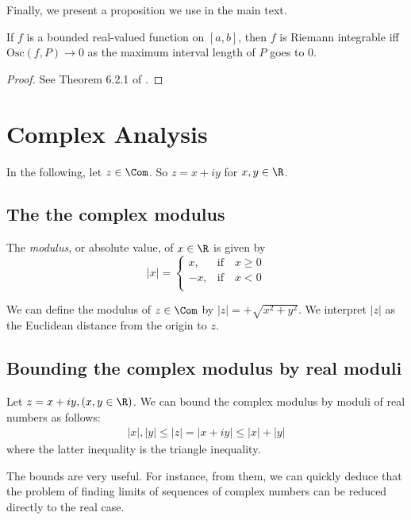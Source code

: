 \documentclass{article} %
\begin{document}
Finally, we present a proposition we use in the main text. 

\begin{proposition}
If $f$ is a bounded real-valued function on $[a,b]$, then $f$ is Riemann integrable iff $\text{Osc}(f,P) \to 0$ as the maximum interval length of $P$ goes to 0.
\label{prop:Riemann_integrable_iff_oscillation_goes_to_zero_as_partition_gets_finer}
\end{proposition}

\begin{proof}
See Theorem 6.2.1 of \cite{strichartz2000way}.	
\end{proof}

\section{Complex Analysis}

In the following, let $z \in \Com$. So $z = x+iy$ for $x,y \in \R$.  

\subsection{The the complex modulus} 

The \textit{modulus}, or absolute value, of $x \in \R$ is given by 
\[ |x| = 
\begin{cases}
x, & \text{if} \quad  x\geq 0 \\
-x, & \text{if} \quad x<0 \\ 	
\end{cases}
 \]

We can define the modulus of $z \in \Com$ by $|z| = + \sqrt{x^2 + y^2}$.   We interpret $|z|$ as the Euclidean distance from the origin to $z$. 

\subsection{Bounding the complex modulus by real moduli} 

 Let $z=x+iy, 	(x, y \in \R)$.   We can bound the complex modulus by moduli of real numbers as follows:
%
\begin{align}
|x|, |y| \leq |z|=|x+iy| \leq |x|+|y|
\label{eqn:bounding_the_complex_modulus_by_real_moduli_appendix} 
\end{align}
where the latter inequality is the triangle inequality. 

The bounds   are very useful.  For instance, from them, we can quickly deduce that the problem of finding limits of sequences of complex numbers can be reduced directly to the real case.
\end{document}
